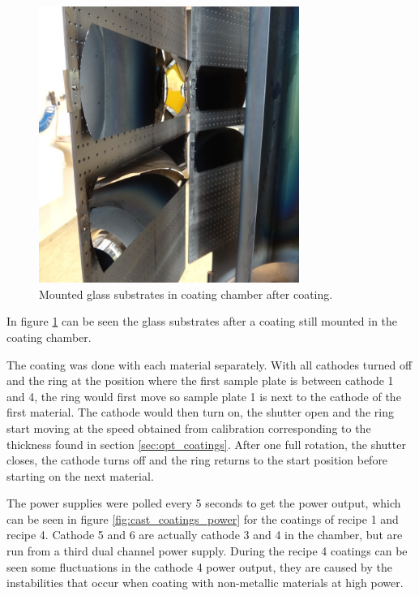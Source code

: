 \begin{figure}[htbp]
  \centering
    \includegraphics[height=9cm]{figures/cast/coated_pieces.jpg}
  \caption{\footnotesize Mounted glass substrates in coating chamber after coating. }
  \label{fig:coated_pieces}
\end{figure}

In figure \ref{fig:coated_pieces} can be seen the glass substrates after a coating still mounted in the coating chamber.

The coating was done with each material separately. With all cathodes turned off and the ring at the position where the first sample plate is between cathode 1 and 4, the ring would first move so sample plate 1 is next to the cathode of the first material. The cathode would then turn on, the shutter open and the ring start moving at the speed obtained from calibration corresponding to the thickness found in section \ref{sec:opt_coatings}. After one full rotation, the shutter closes, the cathode turns off and the ring returns to the start position before starting on the next material.

The power supplies were polled every 5 seconds to get the power output, which can be seen in figure \ref{fig:cast_coatings_power} for the coatings of recipe 1 and recipe 4. Cathode 5 and 6 are actually cathode 3 and 4 in the chamber, but are run from a third dual channel power supply. During the recipe 4 coatings can be seen some fluctuations in the cathode 4 power output, they are caused by the  instabilities that occur when coating with non-metallic materials at high power.

